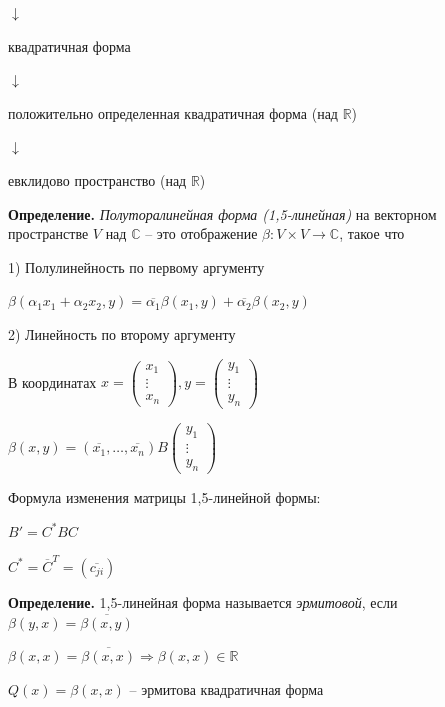 $\downarrow$

квадратичная форма

$\downarrow$

положительно определенная квадратичная форма (над $\mathbb{R}$)

$\downarrow$

евклидово пространство (над $\mathbb{R}$)

\vspace{\baselineskip}
\textbf{Определение.} \textit{Полуторалинейная форма (1,5-линейная)} на векторном пространстве $V$ над $\mathbb{C}$ -- это отображение $\beta: V \times V \rightarrow \mathbb{C}$, такое что

1) Полулинейность по первому аргументу

$\beta(\alpha_1 x_1 + \alpha_2 x_2, y) = \overline{\alpha_1} \beta (x_1, y) + \overline{\alpha_2} \beta (x_2, y)$

2) Линейность по второму аргументу

\vspace{\baselineskip}
В координатах $x = \begin{pmatrix} x_1 \\ \vdots \\ x_{n} \end{pmatrix}, y = \begin{pmatrix} y_1 \\ \vdots \\ y_{n} \end{pmatrix}$

$\beta(x, y) = (\overline{x_1}, \dots, \overline{x_n}) B \begin{pmatrix} y_1 \\ \vdots \\ y_{n} \end{pmatrix}$

\vspace{\baselineskip}
Формула изменения матрицы 1,5-линейной формы:

$B' = C^* B C$

$C^* = \overline{C}^T = (\overline{c_{ji}})$

\vspace{\baselineskip}
\textbf{Определение.} 1,5-линейная форма называется \textit{эрмитовой}, если $\beta(y, x) = \overline{\beta(x, y)}$

\vspace{\baselineskip}
$\beta(x, x) = \overline{\beta(x, x)} \Rightarrow \beta(x, x) \in \mathbb{R}$

$Q(x) = \beta(x, x)$ -- эрмитова квадратичная форма

